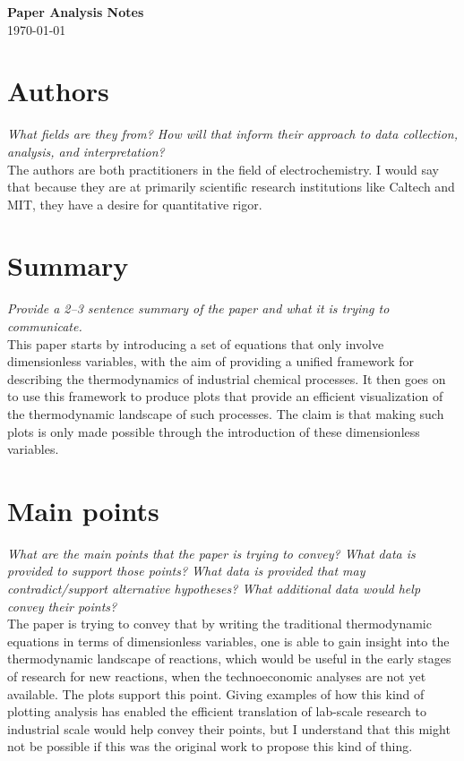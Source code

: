 \documentclass[12pt]{article}
\begin{document}
\begin{center}
    {\LARGE \textbf{Paper Analysis Notes}}\\[6pt]
    \today
\end{center}


\section*{Authors}
\textit{What fields are they from? How will that inform their approach to data collection, analysis, and interpretation?}\\[4pt]
The authors are both practitioners in the field of electrochemistry. I would say that because they are at primarily scientific research institutions like Caltech and MIT, they have a desire for quantitative rigor.

\section*{Summary}
\textit{Provide a 2--3 sentence summary of the paper and what it is trying to communicate.}\\[4pt]
This paper starts by introducing a set of equations that only involve dimensionless variables, with the aim of providing a unified framework for describing the thermodynamics of industrial chemical processes. It then goes on to use this framework to produce plots that provide an efficient visualization of the thermodynamic landscape of such processes. The claim is that making such plots is only made possible through the introduction of these dimensionless variables.

\section*{Main points}
\textit{What are the main points that the paper is trying to convey? What data is provided to support those points? What data is provided that may contradict/support alternative hypotheses? What additional data would help convey their points?}\\[4pt]
The paper is trying to convey that by writing the traditional thermodynamic equations in terms of dimensionless variables, one is able to gain insight into the thermodynamic landscape of reactions, which would be useful in the early stages of research for new reactions, when the technoeconomic analyses are not yet available. The plots support this point. Giving examples of how this kind of plotting analysis has enabled the efficient translation of lab-scale research to industrial scale would help convey their points, but I understand that this might not be possible if this was the original work to propose this kind of thing.
\end{document}
